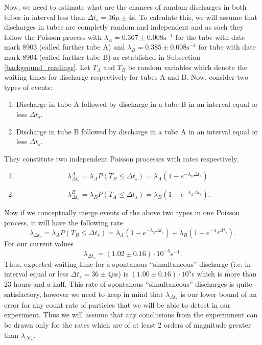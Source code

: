 \documentclass[main.tex]{subfiles}
\begin{document}
Now, we need to estimate what are the chances of random discharges in both tubes in interval less than $\Delta t_s = 36\mu \pm 4 $s.
To calculate this, we will assume that discharges in tubes are completly random and independent and as such they follow the Poisson process with $\lambda_A = 0.367\pm 0.008 \text{s}^{-1}$ for the tube with date mark 8903 (called further tube A) and $\lambda_B = 0.385\pm 0.008 \text{s}^{-1}$ for tube with date mark 8904 (called further tube B) as established in Subsection \ref{background_readings}. Let $T_A$ and $T_B$ be random variables which denote the waiting times for discharge respectively for tubes A and B.
Now, consider two types of events:
\begin{enumerate}
\item Discharge in tube A followed by discharge in a tube B in an interval equal or less $\Delta t_s$.
\item Discharge in tube B followed by discharge in a tube A in an interval equal or less $\Delta t_s$.
\end{enumerate}
They constitute two independent Poisson processes with rates respectively.
\begin{enumerate}

\item 
\begin{equation}
\lambda^A_{\Delta t_s} = \lambda_A P(T_B \leq \Delta t_s) = \lambda_A(1 - e^{-\lambda_B \Delta t_s}).
\end{equation}

\item 
\begin{equation}
\lambda^B_{\Delta t_s} = \lambda_B P(T_A \leq \Delta t_s) = \lambda_B(1 - e^{-\lambda_A \Delta t_s}). 
\end{equation} 
\end{enumerate}
Now if we conceptually merge events of the above two types in one Poisson process, it will have the following rate
\begin{equation}
\lambda_{\Delta t_s} = \lambda_A P(T_B \leq \Delta t_s) = \lambda_A(1 - e^{-\lambda_B \Delta t_s}) + \lambda_B(1 - e^{-\lambda_A \Delta t_s}).
\end{equation}
For our current values
\begin{equation}
\lambda_{\Delta t_s} = (1.02 \pm 0.16) \cdot 10^{-5} \text{s}^{-1}.
\end{equation}
Thus, expected waiting time for a spontanous ``simultaneous'' discharge (i.e. in interval equal or less $\Delta t_s = 36 \pm 4 \mu $s) is $(1.00\pm 0.16)\cdot 10^5 $s which is more than 23 hours and a half.
This rate of spontanous ``simultaneous'' discharges is quite satisfactory, however we need to keep in mind that $\lambda_{\Delta t_s}$ is our lower bound of an error for any count rate of particles that we will be able to detect in our experiment. Thus we will assume that any conclusions from the experimnent can be drawn only for the rates which are of at least 2 orders of magnitude greater than $\lambda_{\Delta t_s}$.
\end{document}
